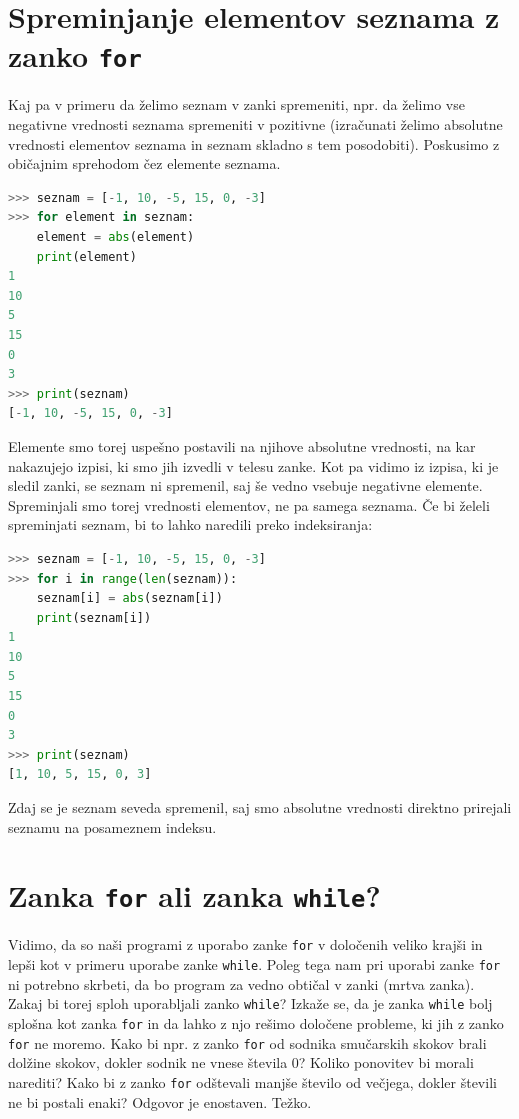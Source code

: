 \section{Spreminjanje elementov seznama z zanko \texttt{for}}
Kaj pa v primeru da želimo seznam v zanki spremeniti, npr. da želimo vse negativne vrednosti seznama spremeniti v pozitivne (izračunati želimo absolutne vrednosti elementov seznama in seznam skladno s tem posodobiti). Poskusimo z običajnim sprehodom čez elemente seznama.
\begin{lstlisting}[language=Python]
>>> seznam = [-1, 10, -5, 15, 0, -3]
>>> for element in seznam:
	element = abs(element)
	print(element)
1
10
5
15
0
3
>>> print(seznam)
[-1, 10, -5, 15, 0, -3]
\end{lstlisting}
Elemente smo torej uspešno postavili na njihove absolutne vrednosti, na kar nakazujejo izpisi, ki smo jih izvedli v telesu zanke. Kot pa vidimo iz izpisa, ki je sledil zanki, se seznam ni spremenil, saj še vedno vsebuje negativne elemente. Spreminjali smo torej vrednosti elementov, ne pa samega seznama. Če bi želeli spreminjati seznam, bi to lahko naredili preko indeksiranja:
\begin{lstlisting}[language=Python]
>>> seznam = [-1, 10, -5, 15, 0, -3]
>>> for i in range(len(seznam)):
	seznam[i] = abs(seznam[i])
	print(seznam[i])
1
10
5
15
0
3
>>> print(seznam)
[1, 10, 5, 15, 0, 3]
\end{lstlisting}
Zdaj se je seznam seveda spremenil, saj smo absolutne vrednosti direktno prirejali seznamu na posameznem indeksu.

\section{Zanka \texttt{for} ali zanka \texttt{while}?}
Vidimo, da so naši programi z uporabo zanke \texttt{for} v določenih veliko krajši in lepši kot v primeru uporabe zanke \texttt{while}. Poleg tega nam pri uporabi zanke \texttt{for} ni potrebno skrbeti, da bo program za vedno obtičal v zanki (mrtva zanka). Zakaj bi torej sploh uporabljali zanko \texttt{while}? Izkaže se, da je zanka \texttt{while} bolj splošna kot zanka \texttt{for} in da lahko z njo rešimo določene probleme, ki jih z zanko \texttt{for} ne moremo. Kako bi npr. z zanko \texttt{for} od sodnika smučarskih skokov brali dolžine skokov, dokler sodnik ne vnese števila 0? Koliko ponovitev bi morali narediti? Kako bi z zanko \texttt{for} odštevali manjše število od večjega, dokler števili ne bi postali enaki? Odgovor je enostaven. Težko.

